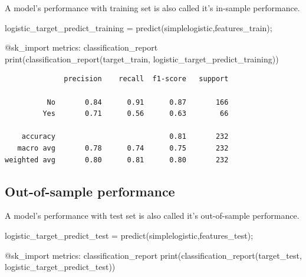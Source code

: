 \documentclass[
  letterpaper,
]{book}
\newenvironment{Shaded}{\begin{snugshade}}{\end{snugshade}}
\newcommand{\FunctionTok}[1]{\textcolor[rgb]{0.28,0.35,0.67}{#1}}
\newcommand{\NormalTok}[1]{\textcolor[rgb]{0.00,0.23,0.31}{#1}}
\newcommand{\OperatorTok}[1]{\textcolor[rgb]{0.37,0.37,0.37}{#1}}
\newcommand{\PreprocessorTok}[1]{\textcolor[rgb]{0.68,0.00,0.00}{#1}}
\begin{document}
A model's performance with training set is also called it's in-sample
performance.

\begin{Shaded}
\begin{Highlighting}[]
\NormalTok{logistic\_target\_predict\_training }\OperatorTok{=} 
    \FunctionTok{predict}\NormalTok{(simplelogistic,features\_train);}

\PreprocessorTok{@sk\_import}\NormalTok{ metrics}\OperatorTok{:}\NormalTok{ classification\_report}
\FunctionTok{print}\NormalTok{(}\FunctionTok{classification\_report}\NormalTok{(target\_train,}
\NormalTok{                     logistic\_target\_predict\_training))}
\end{Highlighting}
\end{Shaded}

\begin{verbatim}
              precision    recall  f1-score   support

          No       0.84      0.91      0.87       166
         Yes       0.71      0.56      0.63        66

    accuracy                           0.81       232
   macro avg       0.78      0.74      0.75       232
weighted avg       0.80      0.81      0.80       232
\end{verbatim}

\hypertarget{out-of-sample-performance}{%
\subsection*{Out-of-sample
performance}\label{out-of-sample-performance}}

A model's performance with test set is also called it's out-of-sample
performance.

\begin{Shaded}
\begin{Highlighting}[]
\NormalTok{logistic\_target\_predict\_test }\OperatorTok{=} 
    \FunctionTok{predict}\NormalTok{(simplelogistic,features\_test);}

\PreprocessorTok{@sk\_import}\NormalTok{ metrics}\OperatorTok{:}\NormalTok{ classification\_report}
\FunctionTok{print}\NormalTok{(}\FunctionTok{classification\_report}\NormalTok{(target\_test,}
\NormalTok{                     logistic\_target\_predict\_test))}
\end{Highlighting}
\end{Shaded}
\end{document}
